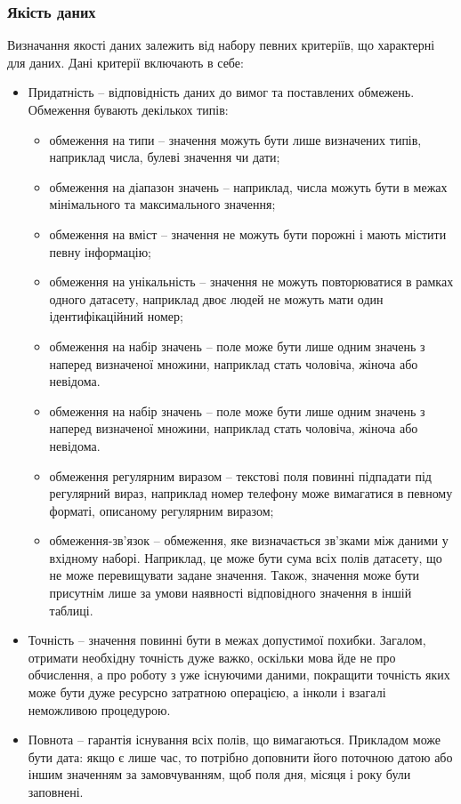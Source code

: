 \subsubsection{Якість даних}
Визначання якості даних залежить від набору певних критеріїв, що характерні для даних. Дані критерії включають в себе:
\begin{itemize}  
	\item Придатність – відповідність даних до вимог та поставлених обмежень. Обмеження бувають декількох типів:
	\begin{itemize}
		\item обмеження на типи – значення можуть бути лише визначених типів, наприклад числа, булеві значення чи дати;
		\item обмеження на діапазон значень – наприклад, числа можуть бути в межах мінімального та максимального значення;
		\item обмеження на вміст – значення не можуть бути порожні і мають містити певну інформацію;
		\item обмеження на унікальність – значення не можуть повторюватися в рамках одного датасету, наприклад двоє людей не можуть мати один ідентифікаційний номер;
		\item обмеження на набір значень – поле може бути лише одним значень з наперед визначеної множини, наприклад стать чоловіча, жіноча або невідома.
		\item обмеження на набір значень – поле може бути лише одним значень з наперед визначеної множини, наприклад стать чоловіча, жіноча або невідома.
		\item обмеження регулярним виразом – текстові поля повинні підпадати під регулярний вираз, наприклад номер телефону може вимагатися в певному форматі, описаному регулярним виразом;
		\item обмеження-зв'язок – обмеження, яке визначається зв'зками між даними у вхідному наборі. Наприклад, це може бути сума всіх полів датасету, що не може перевищувати задане значення. Також, значення може бути присутнім лише за умови наявності відповідного значення в іншій таблиці.
	\end{itemize}
	\item Точність – значення повинні бути в межах допустимої похибки. Загалом, отримати необхідну точність дуже важко, оскільки мова йде не про обчислення, а про роботу з уже існуючими даними, покращити точність яких може бути дуже ресурсно затратною операцією, а інколи і взагалі неможливою процедурою.
	\item Повнота – гарантія існування всіх полів, що вимагаються. Прикладом може бути дата: якщо є лише час, то потрібно доповнити його поточною датою або іншим значенням за замовчуванням, щоб поля дня, місяця і року були заповнені.

\end{itemize}
